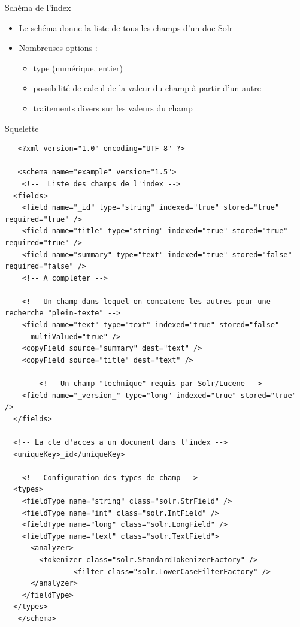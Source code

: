 \begin{frame}{Schéma de l'index }
  \begin{itemize}
    \item Le schéma donne la liste de tous les champs d'un doc Solr
    \item Nombreuses options : 
      \begin{itemize}
        \item type (numérique, entier)
        \item possibilité de calcul de la valeur du champ à partir d'un autre
        \item traitements divers sur les valeurs du champ
      \end{itemize}
  \end{itemize}
\end{frame} %

\begin{frame}[fragile]{Squelette}
  \begin{verbatim}
   <?xml version="1.0" encoding="UTF-8" ?>

   <schema name="example" version="1.5">
    <!--  Liste des champs de l'index -->
  <fields>
    <field name="_id" type="string" indexed="true" stored="true" required="true" />
    <field name="title" type="string" indexed="true" stored="true" required="true" />
    <field name="summary" type="text" indexed="true" stored="false" required="false" />
    <!-- A completer -->

    <!-- Un champ dans lequel on concatene les autres pour une recherche "plein-texte" -->
    <field name="text" type="text" indexed="true" stored="false"
      multiValued="true" />
    <copyField source="summary" dest="text" />
    <copyField source="title" dest="text" />

        <!-- Un champ "technique" requis par Solr/Lucene -->
    <field name="_version_" type="long" indexed="true" stored="true" />
  </fields>

  <!-- La cle d'acces a un document dans l'index -->
  <uniqueKey>_id</uniqueKey>

    <!-- Configuration des types de champ -->
  <types>
    <fieldType name="string" class="solr.StrField" />
    <fieldType name="int" class="solr.IntField" />
    <fieldType name="long" class="solr.LongField" />
    <fieldType name="text" class="solr.TextField">
      <analyzer>
        <tokenizer class="solr.StandardTokenizerFactory" />
                <filter class="solr.LowerCaseFilterFactory" />
      </analyzer>
    </fieldType>
  </types>
   </schema>
  \end{verbatim}
\end{frame}

